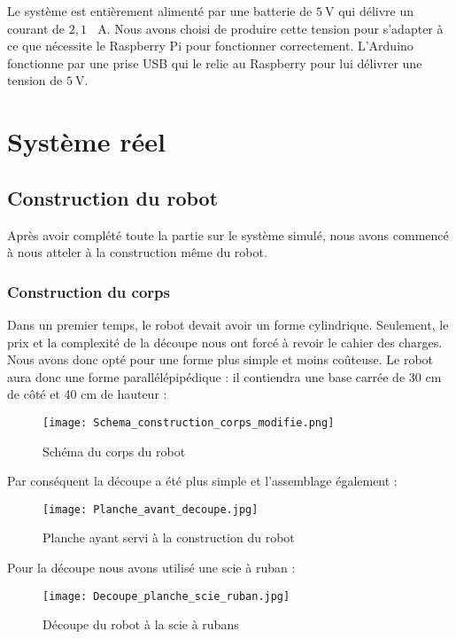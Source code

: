 \documentclass[12pt,a4paper]{article}
\begin{document}
	Le système est entièrement alimenté par une batterie de $\SI{5}{\volt}$ qui délivre un courant de $2,1\text{ } \SI{}{\ampere}$. Nous avons choisi de produire cette tension pour s’adapter à ce que nécessite le Raspberry Pi pour fonctionner correctement. L’Arduino fonctionne par une prise USB qui le relie au Raspberry pour lui délivrer une tension de $\SI{5}{\volt}$.
	\newpage
	\section{Système réel}
	
	\subsection{Construction du robot}
	
	Après avoir complété toute la partie sur le système simulé, nous avons commencé à nous atteler à la construction même du robot.
	
	\subsubsection{Construction du corps}
	
\indent\indent Dans un premier temps, le robot devait avoir un forme cylindrique. Seulement, le prix et la complexité de la découpe nous ont forcé à revoir le cahier des charges. Nous avons donc opté pour une forme plus simple et moins coûteuse. Le robot aura donc une forme parallélépipédique : il contiendra une base carrée de 30 cm de côté et 40 cm de hauteur :
	
	\begin{figure}[ht!]
		\centering
			\texttt{[image: Schema\_construction\_corps\_modifie.png]}
			\caption{Schéma du corps du robot\label{overflow}}
	\end{figure}
	
	Par conséquent la découpe a été plus simple et l’assemblage également :
	
	\begin{figure}[ht!]
		\centering
			\texttt{[image: Planche\_avant\_decoupe.jpg]}
			\caption{Planche ayant servi à la construction du robot\label{overflow}}
	\end{figure}
	\newpage
	
	Pour la découpe nous avons utilisé une scie à ruban :
	
	\begin{figure}[ht!]
		\centering
			\texttt{[image: Decoupe\_planche\_scie\_ruban.jpg]}
			\caption{Découpe du robot à la scie à rubans\label{overflow}}
	\end{figure}
	
\end{document}
